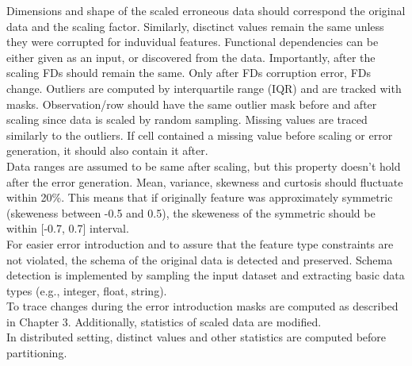 Dimensions and shape of the scaled erroneous data should correspond the original data and the scaling factor. 
Similarly, disctinct values remain the same unless they were corrupted for induvidual features.
Functional dependencies can be either given as an input, or discovered from the data. Importantly, after the scaling FDs should remain the same. Only after FDs corruption error, FDs change.
Outliers are computed by interquartile range (IQR) and are tracked with masks. Observation/row should have the same outlier mask before and after scaling since data is scaled by random sampling.
Missing values are traced similarly to the outliers. If cell contained a missing value before scaling or error generation, it should also contain it after.
\\
Data ranges are assumed to be same after scaling, but this property doesn't hold after the error generation. 
Mean, variance, skewness and curtosis should fluctuate within 20\%. 
This means that if originally feature was approximately symmetric (skeweness between -0.5 and 0.5), the skeweness of the symmetric should be within [-0.7, 0.7] interval.
\\
For easier error introduction and to assure that the feature type constraints are not violated, the schema of the original data is detected and preserved.
Schema detection is implemented by sampling the input dataset and extracting basic data types (e.g., integer, float, string). 
\\
To trace changes during the error introduction masks are computed as described in Chapter 3. Additionally, statistics of scaled data are modified.
\\In distributed setting, distinct values and other statistics are computed before partitioning. 

